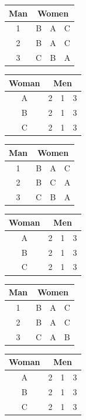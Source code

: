 \documentclass[11pt]{article}
\begin{document}
\begin{qunlist}
\begin{itemize}
\begin{center}
\begin{tabular}{|c|ccc|}\hline 
Man&\multicolumn{3}{|c|}{Women}\\\hline 
1&B&A&C\\\hline 
2&B&A&C\\\hline 
3&C&B&A\\\hline
\end{tabular} 
\hspace{2cm}
\begin{tabular}{|c|ccc|}\hline 
Woman&\multicolumn{3}{|c|}{Men}\\\hline 
A&2&1&3\\\hline 
B&2&1&3\\\hline 
C&2&1&3\\\hline
\end{tabular}
\end{center}

\begin{center}
\begin{tabular}{|c|ccc|}\hline 
Man&\multicolumn{3}{|c|}{Women}\\\hline 
1&B&A&C\\\hline 
2&B&C&A\\\hline 
3&C&B&A\\\hline
\end{tabular} 
\hspace{2cm}
\begin{tabular}{|c|ccc|}\hline 
Woman&\multicolumn{3}{|c|}{Men}\\\hline 
A&2&1&3\\\hline 
B&2&1&3\\\hline 
C&2&1&3\\\hline
\end{tabular}
\end{center}

\begin{center}
\begin{tabular}{|c|ccc|}\hline 
Man&\multicolumn{3}{|c|}{Women}\\\hline 
1&B&A&C\\\hline 
2&B&A&C\\\hline 
3&C&A&B\\\hline
\end{tabular} 
\hspace{2cm}
\begin{tabular}{|c|ccc|}\hline 
Woman&\multicolumn{3}{|c|}{Men}\\\hline 
A&2&1&3\\\hline 
B&2&1&3\\\hline 
C&2&1&3\\\hline
\end{tabular}
\end{center}


\end{itemize}
\end{qunlist}
\end{document}
